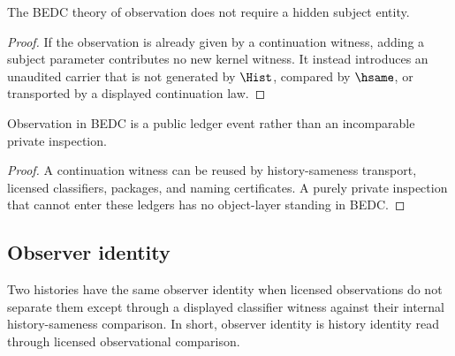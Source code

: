 \begin{corollary}
\label{cor:philosophy-observation-needs-no-subject-substance}
The BEDC theory of observation does not require a hidden subject
entity.
\end{corollary}
\begin{proof}
If the observation is already given by a continuation witness, adding a
subject parameter contributes no new kernel witness. It instead
introduces an unaudited carrier that is not generated by
\(\Hist\), compared by \(\hsame\), or transported by a displayed
continuation law.
\end{proof}

\begin{corollary}
\label{cor:philosophy-observation-ledger-event}
Observation in BEDC is a public ledger event rather than an
incomparable private inspection.
\end{corollary}
\begin{proof}
A continuation witness can be reused by history-sameness transport,
licensed classifiers, packages, and naming certificates. A purely
private inspection that cannot enter these ledgers has no object-layer
standing in BEDC.
\end{proof}

\subsection{Observer identity}
\label{subsec:philosophy-observer-identity}

\begin{definition}
\label{def:philosophy-observer-history-identity}
Two histories have the same observer identity when licensed
observations do not separate them except through a displayed classifier
witness against their internal history-sameness comparison. In short,
observer identity is history identity read through licensed
observational comparison.
\end{definition}

